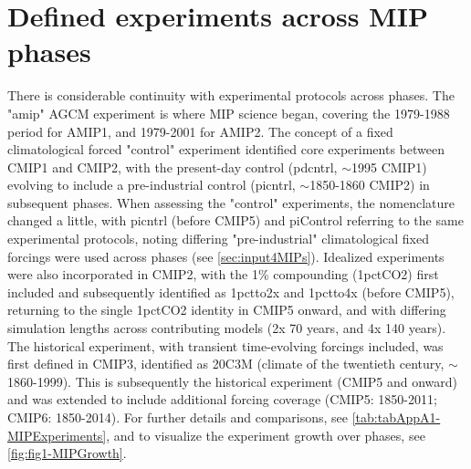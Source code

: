\documentclass[gmd, preprint]{copernicus}
\begin{document}
\section{Defined experiments across MIP phases}  %
\label{sec:secAppA1-MIPExperiments}
There is considerable continuity with experimental protocols across phases. The "amip" AGCM experiment is where MIP science began, covering the 1979-1988 period for AMIP1, and 1979-2001 for AMIP2. The concept of a fixed climatological forced "control" experiment identified core experiments between CMIP1 and CMIP2, with the present-day control (pdcntrl, $\sim$1995 CMIP1) evolving to include a pre-industrial control (picntrl, $\sim$1850-1860 CMIP2) in subsequent phases. When assessing the "control" experiments, the nomenclature changed a little, with picntrl (before CMIP5) and piControl referring to the same experimental protocols, noting differing "pre-industrial" climatological fixed forcings were used across phases (see \autoref{sec:input4MIPs}). Idealized experiments were also incorporated in CMIP2, with the 1\% compounding (1pctCO2) first included and subsequently identified as 1pctto2x and 1pctto4x (before CMIP5), returning to the single 1pctCO2 identity in CMIP5 onward, and with differing simulation lengths across contributing models (2x 70 years, and 4x 140 years). The historical experiment, with transient time-evolving forcings included, was first defined in CMIP3, identified as 20C3M (climate of the twentieth century, $\sim$1860-1999). This is subsequently the historical experiment (CMIP5 and onward) and was extended to include additional forcing coverage (CMIP5: 1850-2011; CMIP6: 1850-2014). For further details and comparisons, see \autoref{tab:tabAppA1-MIPExperiments}, and to visualize the experiment growth over phases, see \autoref{fig:fig1-MIPGrowth}.
\end{document}
